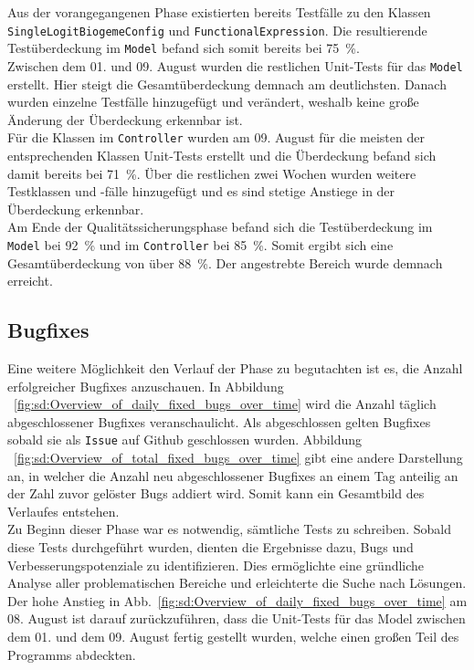 \documentclass{article}
\newcommand{\classref}[1]{\texttt{#1}}
\begin{document}
Aus der vorangegangenen Phase existierten bereits Testfälle zu den Klassen \classref{SingleLogitBiogemeConfig} und \classref{FunctionalExpression}. Die resultierende Testüberdeckung im \texttt{Model} befand sich somit bereits bei 75~\%.
\\
Zwischen dem 01. und 09. August wurden die restlichen Unit-Tests für das \texttt{Model} erstellt. Hier steigt die Gesamtüberdeckung demnach am deutlichsten. Danach wurden einzelne Testfälle hinzugefügt und verändert, weshalb keine große Änderung der Überdeckung erkennbar ist.
\\
Für die Klassen im \texttt{Controller} wurden am 09. August für die meisten der entsprechenden Klassen Unit-Tests erstellt und die Überdeckung befand sich damit bereits bei 71~\%. Über die restlichen zwei Wochen wurden weitere Testklassen und -fälle hinzugefügt und es sind stetige Anstiege in der Überdeckung erkennbar.
\\
Am Ende der Qualitätssicherungsphase befand sich die Testüberdeckung im \texttt{Model} bei 92~\% und im \texttt{Controller} bei 85~\%. Somit ergibt sich eine Gesamtüberdeckung von über 88~\%. Der angestrebte Bereich wurde demnach erreicht.

\newpage
\subsection{Bugfixes}

Eine weitere Möglichkeit den Verlauf der Phase zu begutachten ist es, die Anzahl erfolgreicher Bugfixes anzuschauen. In Abbildung ~\ref{fig:sd:Overview_of_daily_fixed_bugs_over_time} wird die Anzahl täglich abgeschlossener Bugfixes veranschaulicht. Als abgeschlossen gelten Bugfixes sobald sie als \texttt{Issue} auf Github geschlossen wurden. Abbildung ~\ref{fig:sd:Overview_of_total_fixed_bugs_over_time} gibt eine andere Darstellung an, in welcher die Anzahl neu abgeschlossener Bugfixes an einem Tag anteilig an der Zahl zuvor gelöster Bugs addiert wird. Somit kann ein Gesamtbild des Verlaufes entstehen.
\\

Zu Beginn dieser Phase war es notwendig, sämtliche Tests zu schreiben. Sobald diese Tests durchgeführt wurden, dienten die Ergebnisse dazu, Bugs und Verbesserungspotenziale zu identifizieren. Dies ermöglichte eine gründliche Analyse aller problematischen Bereiche und erleichterte die Suche nach Lösungen.\\

Der hohe Anstieg in Abb.~\ref{fig:sd:Overview_of_daily_fixed_bugs_over_time} am 08. August ist darauf zurückzuführen, dass die Unit-Tests für das Model zwischen dem 01. und dem 09. August fertig gestellt wurden, welche einen großen Teil des Programms abdeckten.\\
\end{document}

